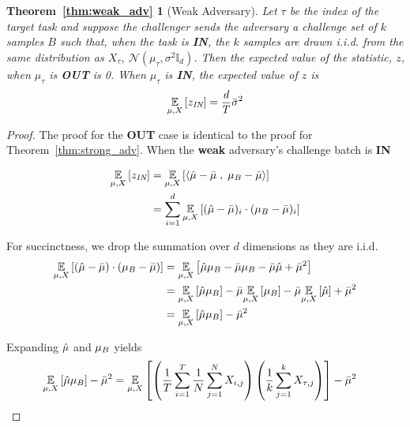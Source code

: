 \newtheorem*{weakadv}{Theorem~\ref{thm:weak_adv}}
\begin{weakadv}[Weak Adversary] 
    Let $\tau$ be the index of the target task and suppose the challenger sends the adversary a challenge set of $k$ samples $B$ such that, when the task is \textbf{IN}, the $k$ samples are drawn i.i.d. from the same distribution as $X_\tau$, $\mathcal{N}(\mu_\tau, \sigma^2 \mathbb{I}_d)$. Then the expected value of the statistic, $z$, when $\mu_\tau$ is \textbf{OUT} is 0. When $\mu_\tau$ is \textbf{IN}, the expected value of $z$ is 
    \[
        \ex{\mu, X}{z_{\textit{IN}}} = \frac{d}{T} \bar{\sigma}^2
    \]
\end{weakadv}


\begin{proof}

The proof for the \textbf{OUT} case is identical to the proof for Theorem~\ref{thm:strong_adv}. When the \textbf{weak} adversary's challenge batch is \textbf{IN} 

\begin{align*}
    \ex{\mu, X}{z_{\textit{IN}}} &= \ex{\mu, X}{\inn{\muhat- \mubar}{\muB - \mubar}} \\ 
    &= \sum_{i=1}^{d} \ex{\mu, X}{(\muhat- \mubar)_i \cdot (\muB - \mubar)_i}
\end{align*}

\noindent For succinctness, we drop the summation over $d$ dimensions as they are i.i.d. 
\begin{align*}
    \ex{\mu, X}{(\muhat - \mubar) \cdot (\muB - \mubar)} &= \ex{\mu, X}{\muhat\muB - \mubar\muB - \mubar\muhat + \mubar^{2}} \\
    &= \ex{\mu, X}{\muhat \muB} - \mubar \ex{\mu, X}{\muB} - \mubar \ex{\mu, X}{\muhat} + \mubar^{2} \\ 
    &= \ex{\mu, X}{\muhat \muB} - \mubar^2 
\end{align*}

\noindent Expanding $\hat{\mu}$ and $\mu_B$ yields
\begin{align*}
\ex{\mu, X}{\muhat \muB} - \mubar^2  &= \ex{\mu, X}{\left( \frac{1}{T} \sum_{i=1}^{T}  \frac{1}{N} \sum_{j=1}^{N} X_{i,j} \right) \left( \frac{1}{k} \sum_{j=1}^{k} X_{\tau , j} \right) } - \mubar^2 
\end{align*}



\end{proof}

